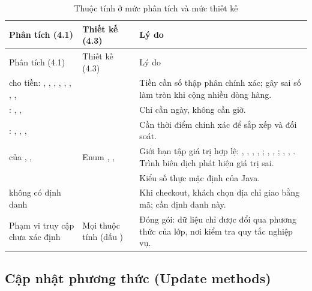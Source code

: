 \documentclass[12pt,a4paper]{article}
\begin{document}
\begin{longtable}{@{}P{3.4cm}P{3.8cm}P{8.7cm}@{}}
\caption{Thuộc tính ở mức phân tích và mức thiết kế}\label{tab:attrs}\\
\toprule
Phân tích (4.1) & Thiết kế (4.3) & Lý do\\
\midrule
\endfirsthead
\toprule
Phân tích (4.1) & Thiết kế (4.3) & Lý do\\
\midrule
\endhead
\small{} cho tiền: , , , , , , , ,  & \small{} & \small Tiền cần số thập phân chính xác;  gây sai số làm tròn khi cộng nhiều dòng hàng.\\
\small{}: , ,  & \small{} & \small Chỉ cần ngày, không cần giờ.\\
\small{}: , , ,  & \small{} & \small Cần thời điểm chính xác để sắp xếp và đối soát.\\
\small{} của , ,  & \small Enum , ,  & \small Giới hạn tập giá trị hợp lệ: , , , , ; , , ; , , . Trình biên dịch phát hiện giá trị sai.\\
\small{} & \small{} & \small Kiểu số thực mặc định của Java.\\
\small {} không có định danh & \small {} & \small Khi checkout, khách chọn địa chỉ giao bằng mã;  cần định danh này.\\
\small Phạm vi truy cập chưa xác định & \small Mọi thuộc tính  (dấu \code{-}) & \small Đóng gói: dữ liệu chỉ được đổi qua phương thức của lớp, nơi kiểm tra quy tắc nghiệp vụ.\\
\bottomrule
\end{longtable}

\subsection{Cập nhật phương thức (Update methods)}
\end{document}
